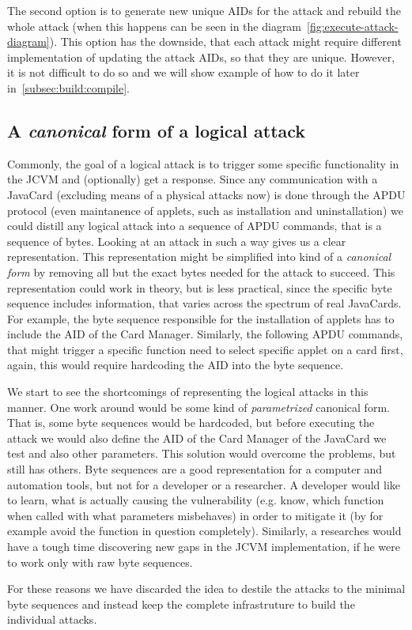             The second option is to generate new unique AIDs for the attack and rebuild the whole attack (when this happens can be seen in the diagram~\ref{fig:execute-attack-diagram}). This option has the downside, that each attack might require different implementation of updating the attack AIDs, so that they are unique.
            However, it is not difficult to do so and we will show example of how to do it later in~\ref{subsec:build:compile}.

        \subsection{A \textit{canonical} form of a logical attack}
        Commonly, the goal of a logical attack is to trigger some specific functionality in the JCVM and (optionally) get a response. Since any communication with a JavaCard (excluding means of a physical attacks now) is done through the APDU protocol (even maintanence of applets, such as installation and uninstallation) we could distill any logical attack into a sequence of APDU commands, that is a sequence of bytes. Looking at an attack in such a way gives us a clear representation. This representation might be simplified into kind of a \textit{canonical form}\footnotemark
        by removing all but the exact bytes needed for the attack to succeed. This representation could work in theory, but is less practical, since the specific byte sequence includes information, that varies across the spectrum of real JavaCards. For example, the byte sequence responsible for the installation of applets has to include the AID of the Card Manager. Similarly, the following APDU commands, that might trigger a specific function need to select specific applet on a card first, again, this would require hardcoding the AID into the byte sequence.

            We start to see the shortcomings of representing the logical attacks in this manner. One work around would be some kind of \textit{parametrized} canonical form. That is, some byte sequences would be hardcoded, but before executing the attack we would also define the AID of the Card Manager of the JavaCard we test and also other parameters. This solution would overcome the problems, but still has others. Byte sequences are a good representation for a computer and automation tools, but not for a developer or a researcher. A developer would like to learn, what is actually causing the vulnerability (e.g. know, which function when called with what parameters misbehaves) in order to mitigate it (by for example avoid the function in question completely). Similarly, a researches would have a tough time discovering new gaps in the JCVM implementation, if he were to work only with raw byte sequences.

            For these reasons we have discarded the idea to destile the attacks to the minimal byte sequences and instead keep the complete infrastruture to build the individual attacks.
